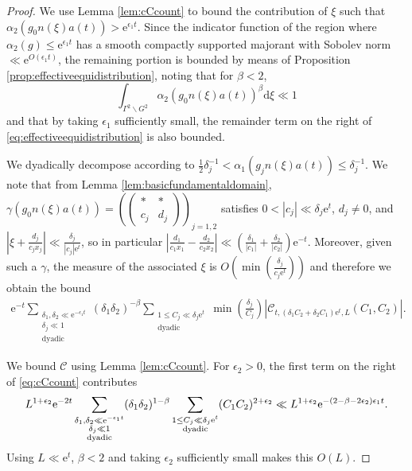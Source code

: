 \documentclass[12pt]{amsart}
\theoremstyle{definition}
\theoremstyle{remark}
\numberwithin{equation}{section}
\newcommand{\dd}{\mathrm{d}}
\newcommand{\e}{\mathrm{e}}
\newcommand{\cC}{\mathcal{C}}
\begin{document}
\begin{proof}
  We use Lemma \ref{lem:cCcount} to bound the contribution of $\xi$ such that $\alpha_2(g_0n(\xi)a(t)) > \e^{\epsilon_1 t}$.
  Since the indicator function of the region where $\alpha_2(g) \leq \e^{\epsilon_1 t}$ has a smooth compactly supported majorant with Sobolev norm $\ll \e^{O(\epsilon_1 t)}$, the remaining portion is bounded by means of Proposition \ref{prop:effectiveequidistribution}, noting that for $\beta < 2$,
  \begin{equation}
    \label{eq:alpha2average}
    \int_{\Gamma^2 \backslash G^2} \alpha_2(g_0 n(\xi) a(t))^\beta \dd \xi \ll 1
  \end{equation}
  and that by taking $\epsilon_1$ sufficiently small, the remainder term on the right of \eqref{eq:effectiveequidistribution} is also bounded. 

  We dyadically decompose according to $\tfrac{1}{2} \delta_j^{-1} < \alpha_1(g_j n(\xi) a(t))\leq \delta_j^{-1}$. 
  We note that from Lemma \ref{lem:basicfundamentaldomain}, $\gamma(g_0n(\xi)a(t)) = \left(\begin{pmatrix}    * & * \\
    c_j & d_j
  \end{pmatrix}
  \right)_{\!\! j=1,2}$ satisfies $0 < |c_j| \ll \delta_j \e^t$, $d_j \neq 0$, and $|\xi + \tfrac{d_j}{c_jx_j}| \ll \tfrac{\delta_j}{|c_j|\e^t}$, so in particular $|\tfrac{d_1}{c_1 x_1} - \tfrac{d_2}{c_2 x_2}| \ll (\tfrac{\delta_1}{|c_1|} + \tfrac{\delta_2}{|c_2|}) \e^{-t}.$
  Moreover, given such a $\gamma$, the measure of the associated $\xi$ is $O ( \min ( \tfrac{\delta_j}{c_j\e^t}))$ and therefore we obtain the bound
  \begin{multline}
    \e^{-t}\sum_{\substack{\delta_1,\delta_2 \ll \e^{-\epsilon_1 t} \\ \delta_j \ll 1\\ \mathrm{dyadic}}} (\delta_1\delta_2)^{-\beta} \sum_{\substack{1\leq C_j \ll \delta_j \e^t \\ \mathrm{dyadic}}} \min( \tfrac{\delta_j}{C_j}) |\cC_{t,(\delta_1 C_2 + \delta_2 C_1)\e^t,L}(C_1, C_2)|.
  \end{multline}

  We bound $\cC$ using Lemma \ref{lem:cCcount}.
  For $\epsilon_2 > 0$, the first term on the right of \eqref{eq:cCcount} contributes
  \begin{equation}
    \label{eq:cCcountfirstterm}
    L^{1+\epsilon_2} \e^{-2t} \sum_{\substack{\delta_1,\delta_2 \ll \e^{-\epsilon_1 t}\\ \delta_j \ll 1 \\ \mathrm{dyadic}}} (\delta_1\delta_2)^{1 -\beta} \sum_{\substack{1\leq C_j \ll \delta_j \e^t \\ \mathrm{dyadic}}} (C_1C_2)^{2 + \epsilon_2} \\
    \ll L^{1 + \epsilon_2} \e^{-(2 -\beta - 2\epsilon_2) \epsilon_1 t}.
  \end{equation}
  Using $L \ll \e^t$, $\beta < 2$ and taking $\epsilon_2$ sufficiently small makes this $O(L)$.
  

\end{proof}
\end{document}
